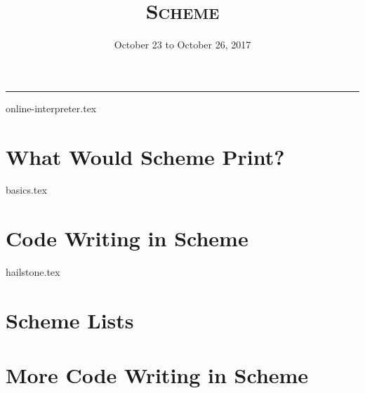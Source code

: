 \documentclass{exam}
\title{\textsc{Scheme}}
\date{October 23 to October 26, 2017}
\begin{document}
\maketitle
\rule{\textwidth}{0.15em}
\fontsize{12}{15}\selectfont

{online-interpreter.tex}
\begin{questions}
\section{What Would Scheme Print?}
{basics.tex}

\section{Code Writing in Scheme}
{hailstone.tex}

\section{Scheme Lists}

\section{More Code Writing in Scheme}

\end{questions}
\end{document}
